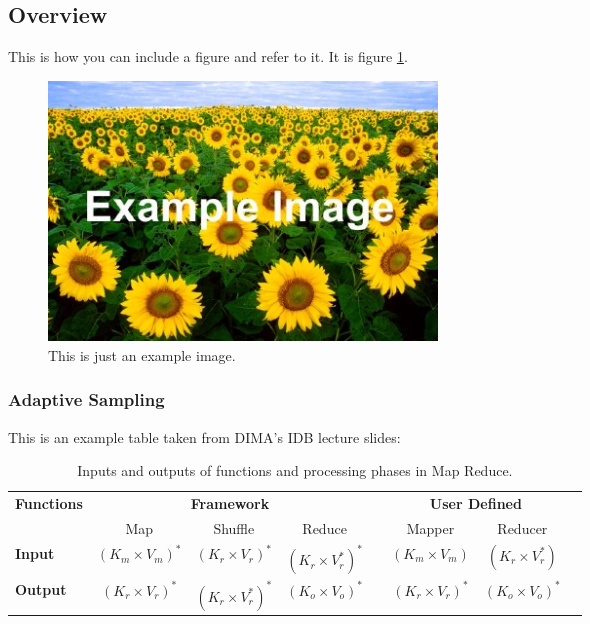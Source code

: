 \subsection{Overview}
\label{sec:Overview}

This is how you can include a figure and refer to it. It is figure \ref{fig:Example}.

\begin{figure}[h!]
	\begin{center}
		\includegraphics[width=0.5\textwidth]{images/Example.jpg}
		\caption{This is just an example image.}
		\label{fig:Example}
	\end{center}
\end{figure}

\FloatBarrier

\subsubsection{Adaptive Sampling}
\label{sec:Adaptive Sampling}

This is an example table taken from DIMA's IDB lecture slides:

\begin{table}[h!]
  \begin{tabular}{lccccccc}
	\toprule    
    \hline
    \textbf{Functions} & \multicolumn{3}{c}{\textbf{Framework}} && \multicolumn{2}{c}{\textbf{User Defined}}\\
    \cmidrule{2-4}  \cmidrule{6-7}  
    & Map & Shuffle & Reduce && Mapper &  Reducer\\
    \midrule
    \textbf{Input} & $ (K_m \times V_m)^{*} $ & $ (K_r \times V_r)^{*} $ & $ (K_r \times V_r^{*})^{*} $ && $ (K_m \times V_m) $  & $ (K_r \times V_r^{*}) $\\
    \hline
    \textbf{Output} & $ (K_r \times V_r)^{*} $ & $ (K_r \times V_r^{*})^{*} $ & $ (K_o \times V_o)^{*} $ && $ (K_r \times V_r)^{*} $ & $ (K_o \times V_o)^{*} $\\
	\hline    
    \bottomrule
  \end{tabular}
  \caption{Inputs and outputs of functions and processing phases in Map Reduce.}
  \label{table:mapRedFunctions}
\end{table}

